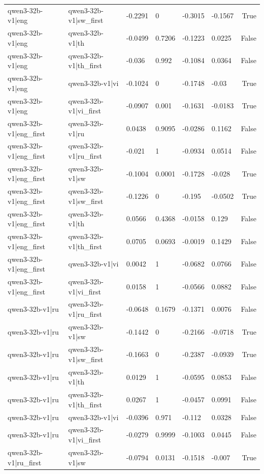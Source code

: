 \begin{table}
\begin{tabular}{llllllr}
qwen3-32b-v1|eng & qwen3-32b-v1|sw_first & -0.2291 & 0 & -0.3015 & -0.1567 & True \\
qwen3-32b-v1|eng & qwen3-32b-v1|th & -0.0499 & 0.7206 & -0.1223 & 0.0225 & False \\
qwen3-32b-v1|eng & qwen3-32b-v1|th_first & -0.036 & 0.992 & -0.1084 & 0.0364 & False \\
qwen3-32b-v1|eng & qwen3-32b-v1|vi & -0.1024 & 0 & -0.1748 & -0.03 & True \\
qwen3-32b-v1|eng & qwen3-32b-v1|vi_first & -0.0907 & 0.001 & -0.1631 & -0.0183 & True \\
qwen3-32b-v1|eng_first & qwen3-32b-v1|ru & 0.0438 & 0.9095 & -0.0286 & 0.1162 & False \\
qwen3-32b-v1|eng_first & qwen3-32b-v1|ru_first & -0.021 & 1 & -0.0934 & 0.0514 & False \\
qwen3-32b-v1|eng_first & qwen3-32b-v1|sw & -0.1004 & 0.0001 & -0.1728 & -0.028 & True \\
qwen3-32b-v1|eng_first & qwen3-32b-v1|sw_first & -0.1226 & 0 & -0.195 & -0.0502 & True \\
qwen3-32b-v1|eng_first & qwen3-32b-v1|th & 0.0566 & 0.4368 & -0.0158 & 0.129 & False \\
qwen3-32b-v1|eng_first & qwen3-32b-v1|th_first & 0.0705 & 0.0693 & -0.0019 & 0.1429 & False \\
qwen3-32b-v1|eng_first & qwen3-32b-v1|vi & 0.0042 & 1 & -0.0682 & 0.0766 & False \\
qwen3-32b-v1|eng_first & qwen3-32b-v1|vi_first & 0.0158 & 1 & -0.0566 & 0.0882 & False \\
qwen3-32b-v1|ru & qwen3-32b-v1|ru_first & -0.0648 & 0.1679 & -0.1371 & 0.0076 & False \\
qwen3-32b-v1|ru & qwen3-32b-v1|sw & -0.1442 & 0 & -0.2166 & -0.0718 & True \\
qwen3-32b-v1|ru & qwen3-32b-v1|sw_first & -0.1663 & 0 & -0.2387 & -0.0939 & True \\
qwen3-32b-v1|ru & qwen3-32b-v1|th & 0.0129 & 1 & -0.0595 & 0.0853 & False \\
qwen3-32b-v1|ru & qwen3-32b-v1|th_first & 0.0267 & 1 & -0.0457 & 0.0991 & False \\
qwen3-32b-v1|ru & qwen3-32b-v1|vi & -0.0396 & 0.971 & -0.112 & 0.0328 & False \\
qwen3-32b-v1|ru & qwen3-32b-v1|vi_first & -0.0279 & 0.9999 & -0.1003 & 0.0445 & False \\
qwen3-32b-v1|ru_first & qwen3-32b-v1|sw & -0.0794 & 0.0131 & -0.1518 & -0.007 & True \\

\end{tabular}
\end{table}
